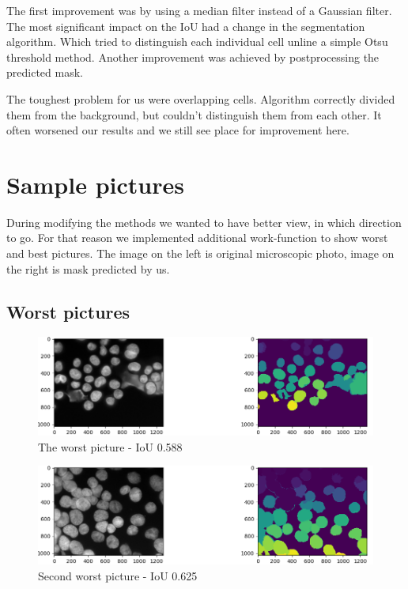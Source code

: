 \documentclass{article}
\begin{document}
The first improvement was by using a median filter instead of a Gaussian filter. The most significant impact on the IoU had a change in the segmentation algorithm. Which tried to distinguish each individual cell unline a simple Otsu threshold method. Another improvement was achieved by postprocessing the predicted mask. 

The toughest problem for us were overlapping cells. Algorithm correctly divided them from the background, but couldn't distinguish them from each other. It often worsened our results and we still see place for improvement here.

\newpage
\section{Sample pictures}
During modifying the methods we wanted to have better view, in which direction to go. For that reason we implemented additional work-function to show worst and best pictures. The image on the left is original microscopic photo, image on the right is mask predicted by us. 


\subsection{Worst pictures}
\begin{figure}[H]
\centering
\includegraphics[width=\textwidth]{figures/1_worst.png}
\caption{The worst picture - IoU 0.588}
\end{figure}

\begin{figure}[H]
\centering
\includegraphics[width=\textwidth]{figures/2_worst.png}
\caption{Second worst picture - IoU 0.625}
\end{figure}
\end{document}
